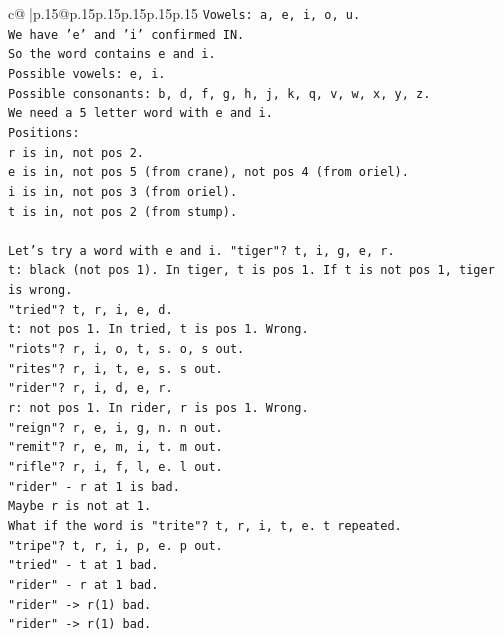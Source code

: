 \documentclass{article}
\begin{document}
{\begin{supertabular}{c@{$\;$}|p{.15\linewidth}@{}p{.15\linewidth}p{.15\linewidth}p{.15\linewidth}p{.15\linewidth}p{.15\linewidth}}
{{{\texttt{Vowels: a, e, i, o, u.} \\
\texttt{We have 'e' and 'i' confirmed IN.} \\
\texttt{So the word contains e and i.} \\
\texttt{Possible vowels: e, i.} \\
\texttt{Possible consonants: b, d, f, g, h, j, k, q, v, w, x, y, z.} \\
\texttt{We need a 5 letter word with e and i.} \\
\texttt{Positions:} \\
\texttt{r is in, not pos 2.} \\
\texttt{e is in, not pos 5 (from crane), not pos 4 (from oriel).} \\
\texttt{i is in, not pos 3 (from oriel).} \\
\texttt{t is in, not pos 2 (from stump).} \\
\\ 
\texttt{Let's try a word with e and i. "tiger"? t, i, g, e, r.} \\
\texttt{t: black (not pos 1). In tiger, t is pos 1. If t is not pos 1, tiger is wrong.} \\
\texttt{"tried"? t, r, i, e, d.} \\
\texttt{t: not pos 1. In tried, t is pos 1. Wrong.} \\
\texttt{"riots"? r, i, o, t, s. o, s out.} \\
\texttt{"rites"? r, i, t, e, s. s out.} \\
\texttt{"rider"? r, i, d, e, r.} \\
\texttt{r: not pos 1. In rider, r is pos 1. Wrong.} \\
\texttt{"reign"? r, e, i, g, n. n out.} \\
\texttt{"remit"? r, e, m, i, t. m out.} \\
\texttt{"rifle"? r, i, f, l, e. l out.} \\
\texttt{"rider" {-} r at 1 is bad.} \\
\texttt{Maybe r is not at 1.} \\
\texttt{What if the word is "trite"? t, r, i, t, e. t repeated.} \\
\texttt{"tripe"? t, r, i, p, e. p out.} \\
\texttt{"tried" {-} t at 1 bad.} \\
\texttt{"rider" {-} r at 1 bad.} \\
\texttt{"rider" {-}> r(1) bad.} \\
\texttt{"rider" {-}> r(1) bad.} \\
}}}
\end{supertabular}}
\end{document}
